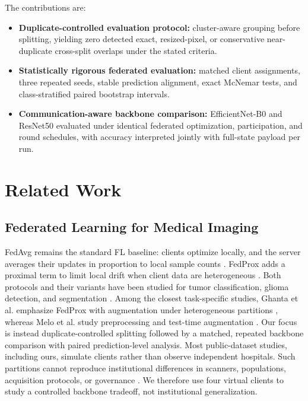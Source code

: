 \documentclass[conference]{IEEEtran}
\begin{document}
The contributions are:
\begin{itemize}
    \raggedright
    \setlength{\itemsep}{0.15em}
    \setlength{\parsep}{0pt}
    \item \textbf{Duplicate-controlled evaluation protocol:} cluster-aware grouping before splitting, yielding zero detected exact, resized-pixel, or conservative near-duplicate cross-split overlaps under the stated criteria.
    \item \textbf{Statistically rigorous federated evaluation:} matched client assignments, three repeated seeds, stable prediction alignment, exact McNemar tests, and class-stratified paired bootstrap intervals.
    \item \textbf{Communication-aware backbone comparison:} EfficientNet-B0 and ResNet50 evaluated under identical federated optimization, participation, and round schedules, with accuracy interpreted jointly with full-state payload per run.
\end{itemize}

\section{Related Work}
\subsection{Federated Learning for Medical Imaging}
FedAvg remains the standard FL baseline: clients optimize locally, and the server averages their updates in proportion to local sample counts \cite{mcmahan2017fedavg}. FedProx adds a proximal term to limit local drift when client data are heterogeneous \cite{li2020fedprox,ghanta2025federated}. Both protocols and their variants have been studied for tumor classification, glioma detection, and segmentation \cite{sharma2025privacy,mastoi2025explainable,saraswat2026hybrid,wakili2025twinsegnet}. Among the closest task-specific studies, Ghanta et al. emphasize FedProx with augmentation under heterogeneous partitions \cite{ghanta2025federated}, whereas Melo et al. study preprocessing and test-time augmentation \cite{melo2026exploiting}. Our focus is instead duplicate-controlled splitting followed by a matched, repeated backbone comparison with paired prediction-level analysis. Most public-dataset studies, including ours, simulate clients rather than observe independent hospitals. Such partitions cannot reproduce institutional differences in scanners, populations, acquisition protocols, or governance \cite{rieke2020future,xu2023federated,naseer2026medfl}. We therefore use four virtual clients to study a controlled backbone tradeoff, not institutional generalization.
\end{document}

